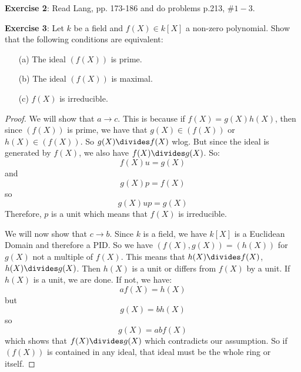 \documentclass{article}
\begin{document}
\textbf{Exercise 2}: Read Lang, pp. 173-186 and do problems p.213, $\#1-3$.

\textbf{Exercise 3}: Let $k$ be a field and $f(X) \in k[X]$ a non-zero polynomial. Show that the following conditions are equivalent:
    \begin{itemize}
        \item [(a)] The ideal $(f(X))$ is prime.

        \item [(b)] The ideal $(f(X))$ is maximal.

        \item [(c)] $f(X)$ is irreducible.
    \end{itemize}
        \begin{proof}
            We will show that $a \rightarrow c$. This is because if $f(X) = g(X)h(X)$, then since $(f(X))$ is prime, we have that $g(X) \in (f(X))$ or $h(X) \in (f(X))$. So $g(X) \divides f(X)$ wlog. But since the ideal is generated by $f(X)$, we also have $f(X) \divides g(X)$. So:
                \begin{equation*}
                    f(X)u = g(X)
                \end{equation*}
            and 
                \begin{equation*}
                    g(X)p = f(X)
                \end{equation*}
            so
                \begin{equation*}
                    g(X)up = g(X)
                \end{equation*}
            Therefore, $p$ is a unit which means that $f(X)$ is irreducible.

            We will now show that $c \rightarrow b$. Since $k$ is a field, we have $k[X]$ is a Euclidean Domain and therefore a PID. So we have $(f(X), g(X)) = (h(X))$ for $g(X)$ not a multiple of $f(X)$. This means that $h(X) \divides f(X)$, $h(X) \divides g(X)$. Then $h(X)$ is a unit or differs from $f(X)$ by a unit. If $h(X)$ is a unit, we are done. If not, we have:
                \begin{equation*}
                    af(X) = h(X)
                \end{equation*}
            but 
                \begin{equation*}
                    g(X) = bh(X)
                \end{equation*}
            so
                \begin{equation*}
                    g(X) = abf(X)
                \end{equation*}
            which shows that $f(X) \divides g(X)$ which contradicts our assumption. So if $(f(X))$ is contained in any ideal, that ideal must be the whole ring or itself.


\end{proof}
\end{document}
